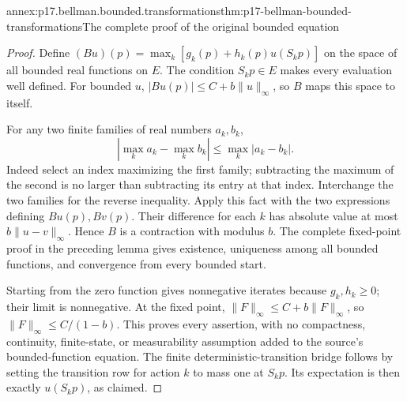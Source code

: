 \begin{annexitem}{annex:p17.bellman.bounded.transformations}{thm:p17-bellman-bounded-transformations}{The complete proof of the original bounded equation}
\begin{proof}
Define \((Bu)(p)=\max_k[g_k(p)+h_k(p)u(S_kp)]\)
on the space of all bounded real functions on \(E\).
The condition \(S_kp\in E\) makes every evaluation
well defined. For bounded \(u\),
\(|Bu(p)|\leq C+b\|u\|_\infty\), so \(B\)
maps this space to itself.

For any two finite families of real numbers \(a_k,b_k\),
\[
                       |\max_k a_k-\max_k b_k|
                                      \leq\max_k|a_k-b_k|.
\]
Indeed select an index maximizing the first family;
subtracting the maximum of the second is no larger
than subtracting its entry at that index. Interchange
the two families for the reverse inequality.
Apply this fact with the two expressions defining
\(Bu(p),Bv(p)\). Their difference for each \(k\)
has absolute value at most \(b\|u-v\|_\infty\).
Hence \(B\) is a contraction with modulus \(b\).
The complete fixed-point proof in the preceding
lemma gives existence, uniqueness among all bounded
functions, and convergence from every bounded start.

Starting from the zero function gives nonnegative
iterates because \(g_k,h_k\geq0\); their limit is
nonnegative. At the fixed point,
\(\|F\|_\infty\leq C+b\|F\|_\infty\),
so \(\|F\|_\infty\leq C/(1-b)\).
This proves every assertion, with no compactness,
continuity, finite-state, or measurability assumption
added to the source's bounded-function equation.
The finite deterministic-transition bridge follows
by setting the transition row for action \(k\)
to mass one at \(S_kp\). Its expectation is then
exactly \(u(S_kp)\), as claimed.
\end{proof}
\end{annexitem}


